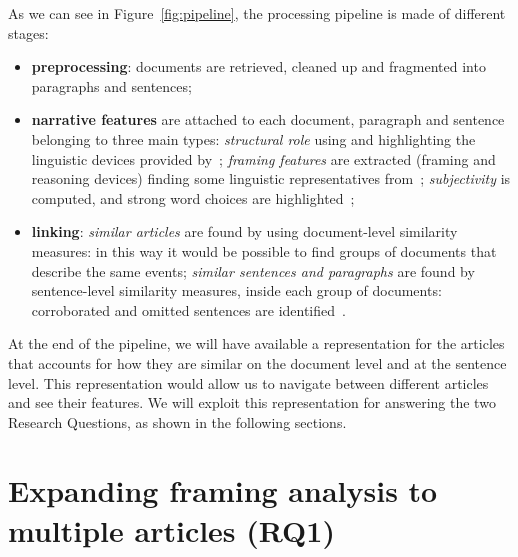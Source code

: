 As we can see in Figure~\ref{fig:pipeline}, the processing pipeline is made of different stages:
\begin{itemize}
    \item \textbf{preprocessing}: documents are retrieved, cleaned up and fragmented into paragraphs and sentences;
    \item \textbf{narrative features} are attached to each document, paragraph and sentence belonging to three main types:
    \emph{structural role} using and highlighting the linguistic devices provided by~\cite{zahid2019towards};
    \emph{framing features} are extracted (framing and reasoning devices) finding some linguistic representatives from~\cite{gamson1989media,fillmore2006frame};
    \emph{subjectivity} is computed, and strong word choices are highlighted~\cite{liu2010sentiment};
    \item \textbf{linking}: \emph{similar articles} are found by using document-level similarity measures: in this way it would be possible to find groups of documents that describe the same events; \emph{similar sentences and paragraphs} are found by sentence-level similarity measures, inside each group of documents: corroborated and omitted sentences are identified~\cite{bountouridis2018explaining}.
\end{itemize}

At the end of the pipeline, we will have available a representation for the articles that accounts for how they are similar on the document level and at the sentence level.
This representation would allow us to navigate between different articles and see their features. We will exploit this representation for answering the two Research Questions, as shown in the following sections.

\section{Expanding framing analysis to multiple articles (RQ1)}
\label{sec:prop_rq1}

